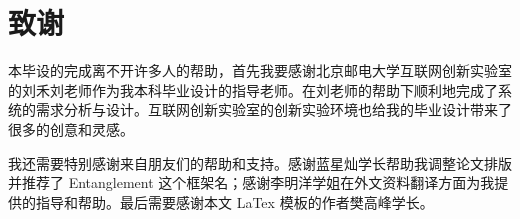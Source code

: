\chapter*{致\qquad 谢}
\songti{}

本毕设的完成离不开许多人的帮助，首先我要感谢北京邮电大学互联网创新实验室的刘禾刘老师作为我本科毕业设计的指导老师。在刘老师的帮助下顺利地完成了系统的需求分析与设计。互联网创新实验室的创新实验环境也给我的毕业设计带来了很多的创意和灵感。

我还需要特别感谢来自朋友们的帮助和支持。感谢蓝星灿学长帮助我调整论文排版并推荐了 Entanglement 这个框架名；感谢李明洋学姐在外文资料翻译方面为我提供的指导和帮助。最后需要感谢本文 LaTex 模板的作者樊高峰学长。


